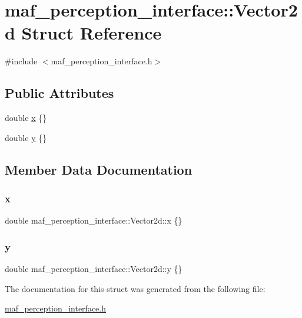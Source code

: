 \hypertarget{structmaf__perception__interface_1_1Vector2d}{}\section{maf\+\_\+perception\+\_\+interface\+:\+:Vector2d Struct Reference}
\label{structmaf__perception__interface_1_1Vector2d}


{\ttfamily \#include $<$maf\+\_\+perception\+\_\+interface.\+h$>$}

\subsection*{Public Attributes}
\begin{DoxyCompactItemize}
\item 
double \hyperlink{structmaf__perception__interface_1_1Vector2d_acef76d451d83af127eb3182b7cbab3a3}{x} \{\}
\item 
double \hyperlink{structmaf__perception__interface_1_1Vector2d_a2cedcf23fd1b5dcfdb1f16f2b7f0be58}{y} \{\}
\end{DoxyCompactItemize}


\subsection{Member Data Documentation}
\mbox{\label{structmaf__perception__interface_1_1Vector2d_acef76d451d83af127eb3182b7cbab3a3}} 
\subsubsection{\texorpdfstring{x}{x}}
{\footnotesize\ttfamily double maf\+\_\+perception\+\_\+interface\+::\+Vector2d\+::x \{\}}

\mbox{\label{structmaf__perception__interface_1_1Vector2d_a2cedcf23fd1b5dcfdb1f16f2b7f0be58}} 
\subsubsection{\texorpdfstring{y}{y}}
{\footnotesize\ttfamily double maf\+\_\+perception\+\_\+interface\+::\+Vector2d\+::y \{\}}



The documentation for this struct was generated from the following file\+:\begin{DoxyCompactItemize}
\item 
\hyperlink{maf__perception__interface_8h}{maf\+\_\+perception\+\_\+interface.\+h}\end{DoxyCompactItemize}
